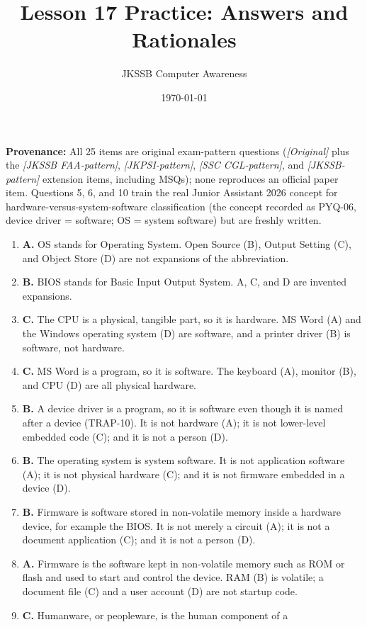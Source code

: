 \documentclass[11pt]{article}
\title{Lesson 17 Practice: Answers and Rationales}
\author{JKSSB Computer Awareness}
\date{\today}
\begin{document}
\maketitle
\noindent\textbf{Provenance:} All 25 items are original exam-pattern questions (\textit{[Original]} plus the \textit{[JKSSB FAA-pattern]}, \textit{[JKPSI-pattern]}, \textit{[SSC CGL-pattern]}, and \textit{[JKSSB-pattern]} extension items, including MSQs); none reproduces an official paper item.
Questions 5, 6, and 10 train the real Junior Assistant 2026 concept for
hardware-versus-system-software classification (the concept recorded as PYQ-06,
device driver = software; OS = system software) but are freshly written.
\begin{enumerate}[label=\textbf{Q\arabic*.}, leftmargin=*]
\item \textbf{A.} OS stands for Operating System. Open Source (B), Output
  Setting (C), and Object Store (D) are not expansions of the abbreviation.
\item \textbf{B.} BIOS stands for Basic Input Output System. A, C, and D are
  invented expansions.
\item \textbf{C.} The CPU is a physical, tangible part, so it is hardware.
  MS Word (A) and the Windows operating system (D) are software, and a printer
  driver (B) is software, not hardware.
\item \textbf{C.} MS Word is a program, so it is software. The keyboard (A),
  monitor (B), and CPU (D) are all physical hardware.
\item \textbf{B.} A device driver is a program, so it is software even though
  it is named after a device (TRAP-10). It is not hardware (A); it is not
  lower-level embedded code (C); and it is not a person (D).
\item \textbf{B.} The operating system is system software. It is not
  application software (A); it is not physical hardware (C); and it is not
  firmware embedded in a device (D).
\item \textbf{B.} Firmware is software stored in non-volatile memory inside a
  hardware device, for example the BIOS. It is not merely a circuit (A); it is
  not a document application (C); and it is not a person (D).
\item \textbf{A.} Firmware is the software kept in non-volatile memory such as
  ROM or flash and used to start and control the device. RAM (B) is volatile;
  a document file (C) and a user account (D) are not startup code.
\item \textbf{C.} Humanware, or peopleware, is the human component of a

\end{enumerate}
\end{document}
